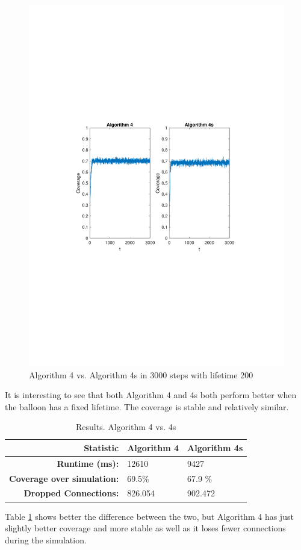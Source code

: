 \begin{figure}[H]
\centering
\includegraphics[scale=0.7, trim={3cm 10cm 4cm 9cm},clip]{graphics/coverage_alg4_vs_alg4s_3000_200.pdf}
\caption{Algorithm 4 vs. Algorithm 4s in 3000 steps with lifetime 200}
\label{fig:alg4vsalg4s_200}
\end{figure}

It is interesting to see that both Algorithm 4 and 4s both perform better when the balloon has a fixed lifetime. The coverage is stable and relatively similar. 

\begin{table}[]
\centering

\begin{tabular}{r|l|l|}

\textbf{Statistic}                 & \textbf{Algorithm 4} & \textbf{Algorithm 4s} \\ \hline
\textbf{Runtime (ms):}                  & 12610             & 9427                  \\ \hline
\textbf{Coverage over simulation:} & 69.5\%               & 67.9 \%               \\ \hline
\textbf{Dropped Connections:}      & 826.054              & 902.472               \\ \hline
\end{tabular}
\caption{Results. Algorithm 4 vs. 4s}
\label{tbl:res}
\end{table}

Table \ref{tbl:res} shows better the difference between the two, but Algorithm 4 has just slightly better coverage and more stable as well as it loses fewer connections during the simulation.